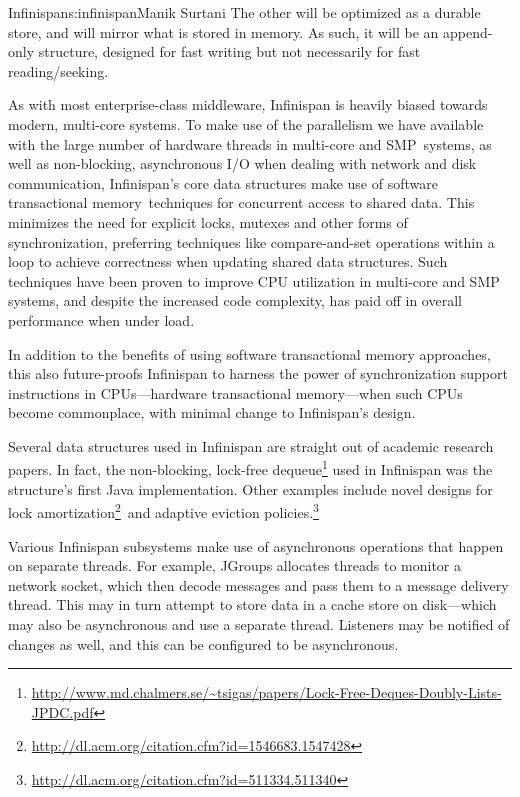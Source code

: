 \begin{aosachapter}{Infinispan}{s:infinispan}{Manik Surtani}
The other will be optimized as a durable store, and will mirror what is
stored in memory. As such, it will be an append-only structure,
designed for fast writing but not necessarily for fast reading/seeking.


As with most enterprise-class middleware, Infinispan is heavily biased
towards modern, multi-core systems. To make use of the parallelism we
have available with the large number of hardware threads in multi-core
and SMP~systems, as well as non-blocking, asynchronous I/O when dealing
with network and disk communication, Infinispan's core data structures
make use of software transactional memory~techniques for concurrent
access to shared data. This minimizes the need for explicit locks,
mutexes and other forms of synchronization, preferring techniques like
compare-and-set operations within a loop to achieve correctness when
updating shared data structures. Such techniques have been proven to
improve CPU utilization in multi-core and SMP systems, and despite the
increased code complexity, has paid off in overall performance when
under load.

In addition to the benefits of using software transactional memory
approaches, this also future-proofs Infinispan to harness the power of
synchronization support instructions in CPUs---hardware transactional
memory---when such CPUs become commonplace, with minimal change to
Infinispan's design.

Several data structures used in Infinispan are straight out of academic
research papers. In fact, the non-blocking, lock-free dequeue\footnote{\url{http://www.md.chalmers.se/~tsigas/papers/Lock-Free-Deques-Doubly-Lists-JPDC.pdf}}
used in Infinispan was the structure's first Java implementation. Other
examples include novel designs for lock amortization\footnote{\url{http://dl.acm.org/citation.cfm?id=1546683.1547428}}~and
adaptive eviction policies.\footnote{\url{http://dl.acm.org/citation.cfm?id=511334.511340}}


Various Infinispan subsystems make use of asynchronous operations that
happen on separate threads. For example, JGroups allocates threads to
monitor a network socket, which then decode messages and pass them to a
message delivery thread. This may in turn attempt to store data in a
cache store on disk---which may also be asynchronous and use a separate
thread. Listeners may be notified of changes as well, and this can be
configured to be asynchronous.


\end{aosachapter}
